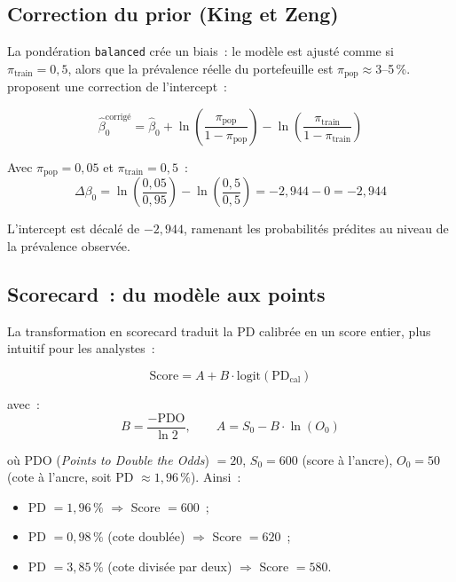\documentclass[12pt, a4paper, twoside, openright]{report}
\theoremstyle{definition}
\begin{document}
\subsection{Correction du prior (King et Zeng)}

La pondération \texttt{balanced} crée un biais~: le modèle est ajusté comme si $\pi_{\text{train}} = 0{,}5$, alors que la prévalence réelle du portefeuille est $\pi_{\text{pop}} \approx 3$--5\,\%. \citet{king_zeng2001} proposent une correction de l'intercept~:

\begin{equation}
\hat{\beta}_0^{\text{corrigé}} = \hat{\beta}_0 + \ln\!\left(\frac{\pi_{\text{pop}}}{1 - \pi_{\text{pop}}}\right) - \ln\!\left(\frac{\pi_{\text{train}}}{1 - \pi_{\text{train}}}\right)
\label{eq:prior-correction}
\end{equation}

\noindent Avec $\pi_{\text{pop}} = 0{,}05$ et $\pi_{\text{train}} = 0{,}5$~:
$$\Delta\beta_0 = \ln\!\left(\frac{0{,}05}{0{,}95}\right) - \ln\!\left(\frac{0{,}5}{0{,}5}\right) = -2{,}944 - 0 = -2{,}944$$

L'intercept est décalé de $-2{,}944$, ramenant les probabilités prédites au niveau de la prévalence observée.

\subsection{Scorecard~: du modèle aux points}

La transformation en scorecard traduit la PD calibrée en un score entier, plus intuitif pour les analystes~:

\begin{equation}
\text{Score} = A + B \cdot \text{logit}(\text{PD}_{\text{cal}})
\label{eq:scorecard}
\end{equation}

\noindent avec~:
\begin{equation}
B = \frac{-\text{PDO}}{\ln 2}, \qquad A = S_0 - B \cdot \ln(O_0)
\label{eq:scorecard-params}
\end{equation}

\noindent où PDO (\emph{Points to Double the Odds}) $= 20$, $S_0 = 600$ (score à l'ancre), $O_0 = 50$ (cote à l'ancre, soit PD $\approx 1{,}96\,\%$). Ainsi~:
\begin{itemize}[nosep]
  \item PD $= 1{,}96\,\%$ $\Rightarrow$ Score $= 600$~;
  \item PD $= 0{,}98\,\%$ (cote doublée) $\Rightarrow$ Score $= 620$~;
  \item PD $= 3{,}85\,\%$ (cote divisée par deux) $\Rightarrow$ Score $= 580$.
\end{itemize}
\end{document}
